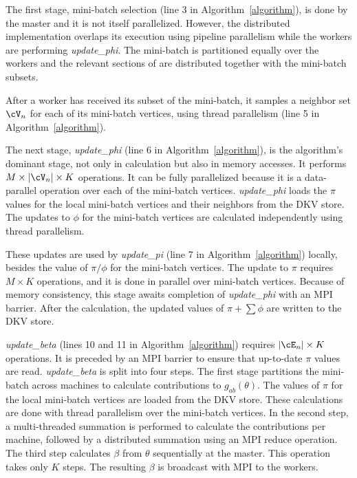 The first stage, mini-batch selection (line 3 in Algorithm~\ref{algorithm}),
is done by the master and it is
not itself parallelized. However, the distributed implementation overlaps
its execution using pipeline parallelism while the workers are
performing \textit{update\_phi}. The mini-batch is partitioned equally over
the workers and the relevant sections of \Edges are distributed together with the
mini-batch subsets.

After a worker has received its subset of the mini-batch, it samples a neighbor
set $\Neighbors$ for each of its mini-batch vertices, using thread parallelism
(line 5 in Algorithm~\ref{algorithm}).

The next stage, \textit{update\_phi} (line 6 in Algorithm~\ref{algorithm}), is the algorithm's dominant stage, not
only in calculation but also in memory accesses. It performs $M \times
|\Neighbors| \times
K$ operations. It can be fully parallelized because it is a data-parallel
operation over each of the mini-batch vertices. \textit{update\_phi} loads the
$\pi$ values for the local mini-batch vertices and their neighbors from the
DKV store. The updates to $\phi$ for the mini-batch vertices are calculated
independently using thread parallelism.

These updates are used by \textit{update\_pi} (line 7 in
Algorithm~\ref{algorithm}) locally, besides the value of
$\pi/\phi$ for the mini-batch vertices. The update to $\pi$ requires
$M \times K$ operations, and it is done in parallel over mini-batch vertices. Because of
memory consistency, this stage awaits completion of \textit{update\_phi} with
an MPI barrier. After the calculation, the updated values of $\pi+\sum\phi$
are written to the DKV store.

\textit{update\_beta} (lines 10 and 11 in Algorithm~\ref{algorithm}) requires $|\Minibatch| \times K$ operations. It is preceded by an MPI
barrier to ensure that up-to-date $\pi$ values are read. \textit{update\_beta}
is split into four steps. The first stage partitions the mini-batch across
machines to calculate contributions to $g_{ab}(\theta)$. The values of $\pi$ for
the local mini-batch vertices are loaded from the DKV store. These calculations
are done with thread parallelism over the mini-batch vertices. In the second step,
a multi-threaded summation is performed to calculate the contributions per
machine, followed by a distributed summation using an MPI reduce operation. The
third step calculates $\beta$ from $\theta$ sequentially at the master. This
operation takes only $K$ steps. The resulting $\beta$ is broadcast with MPI
to the workers.


